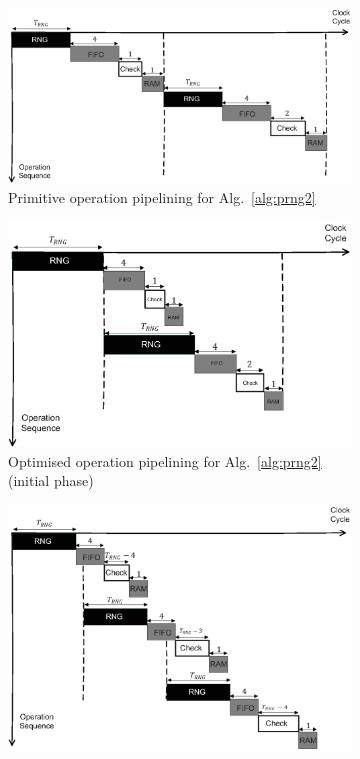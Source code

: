 \documentclass[preprint]{iacrtrans}
\begin{document}
\begin{figure}[!tb]
\centering
\begin{subfigure}[t]{0.45\textwidth}\centering
\includegraphics[width=\textwidth]{./fig/pipeline_rng.eps}
\caption{Primitive operation pipelining for Alg.~\ref{alg:prng2}}
\label{fig:pipeline_rng}
\end{subfigure}
\hspace{1em}
\begin{subfigure}[t]{0.45\textwidth}\centering
\includegraphics[width=\textwidth]{./fig/pipeline_rng2.eps}
\caption{Optimised operation pipelining for Alg.~\ref{alg:prng2} (initial phase) }
\label{fig:pipeline_rng2}
\end{subfigure}
\begin{subfigure}[t]{0.45\textwidth}\centering
\includegraphics[width=\textwidth]{./fig/pipeline_rng3.eps}

\end{subfigure}
\end{figure}
\end{document}
